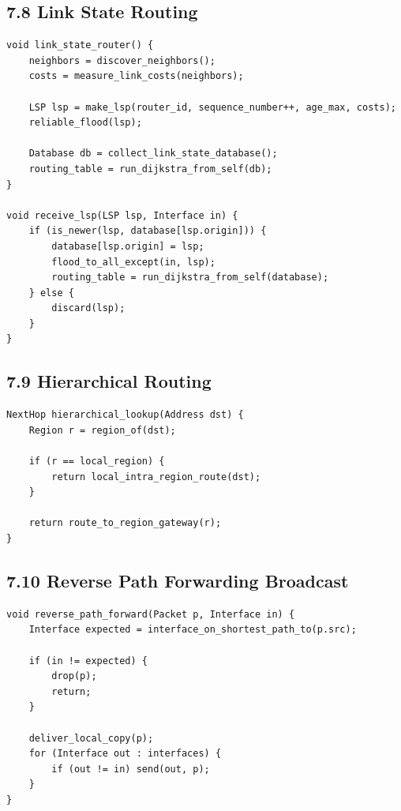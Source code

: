 \documentclass[11pt]{article}
\begin{document}
\subsection{7.8 Link State Routing}\label{link-state-routing}

\begin{verbatim}
void link_state_router() {
    neighbors = discover_neighbors();
    costs = measure_link_costs(neighbors);

    LSP lsp = make_lsp(router_id, sequence_number++, age_max, costs);
    reliable_flood(lsp);

    Database db = collect_link_state_database();
    routing_table = run_dijkstra_from_self(db);
}

void receive_lsp(LSP lsp, Interface in) {
    if (is_newer(lsp, database[lsp.origin])) {
        database[lsp.origin] = lsp;
        flood_to_all_except(in, lsp);
        routing_table = run_dijkstra_from_self(database);
    } else {
        discard(lsp);
    }
}
\end{verbatim}

\subsection{7.9 Hierarchical Routing}\label{hierarchical-routing}

\begin{verbatim}
NextHop hierarchical_lookup(Address dst) {
    Region r = region_of(dst);

    if (r == local_region) {
        return local_intra_region_route(dst);
    }

    return route_to_region_gateway(r);
}
\end{verbatim}

\subsection{7.10 Reverse Path Forwarding
Broadcast}\label{reverse-path-forwarding-broadcast}

\begin{verbatim}
void reverse_path_forward(Packet p, Interface in) {
    Interface expected = interface_on_shortest_path_to(p.src);

    if (in != expected) {
        drop(p);
        return;
    }

    deliver_local_copy(p);
    for (Interface out : interfaces) {
        if (out != in) send(out, p);
    }
}
\end{verbatim}
\end{document}
